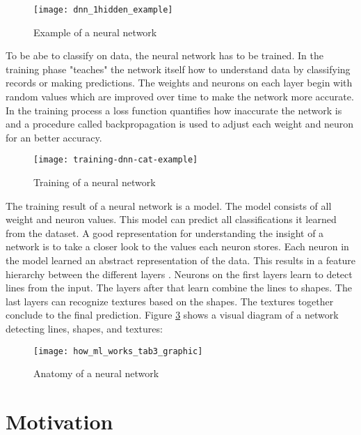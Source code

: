 \begin{figure}[H]
    \centering
    \texttt{[image: dnn\_1hidden\_example]}
    \caption{\cite{dnn_1hidden_example_image} Example of a neural network}
    \label{fig:dnn_1hidden_example}
\end{figure}

To be abe to classify on data, the neural network has to be trained.
In the training phase "teaches" the network itself how to understand data by classifying records or making predictions. \cite{ibm-watson-healthcare}
The weights and neurons on each layer begin with random values which are improved over time to make the network more accurate.
In the training process a loss function quantifies how inaccurate the network is and a procedure called backpropagation is used to adjust each weight and neuron for an better accuracy.
\cite{nvidia-ai-explained, tensorflow-about}

\begin{figure}[H]
    \centering
    \texttt{[image: training-dnn-cat-example]}
    \caption{\cite{tf_dnn_training_cat_example} Training of a neural network}
    \label{fig:tf_dnn_training_cat_example}
\end{figure}

The training result of a neural network is a model.
The model consists of all weight and neuron values.
\hfill \break
This model can predict all classifications it learned from the dataset.
A good representation for understanding the insight of a network is to take a closer look to the values each neuron stores.
Each neuron in the model learned an abstract representation of the data.
This results in a feature hierarchy between the different layers \cite{skymind_neural_network}.
Neurons on the first layers learn to detect lines from the input.
The layers after that learn combine the lines to shapes.
The last layers can recognize textures based on the shapes.
The textures together conclude to the final prediction.
Figure \ref{fig:tf_dnn_shapes_textures} shows a visual diagram of a network detecting lines, shapes, and textures:
\cite{nvidia-ai-explained, tensorflow-about}

\begin{figure}[H]
    \centering
    \texttt{[image: how\_ml\_works\_tab3\_graphic]}
    \caption{\cite{tf_dnn_shapes_textures} Anatomy of a neural network}
    \label{fig:tf_dnn_shapes_textures}
\end{figure}

\section{Motivation}

